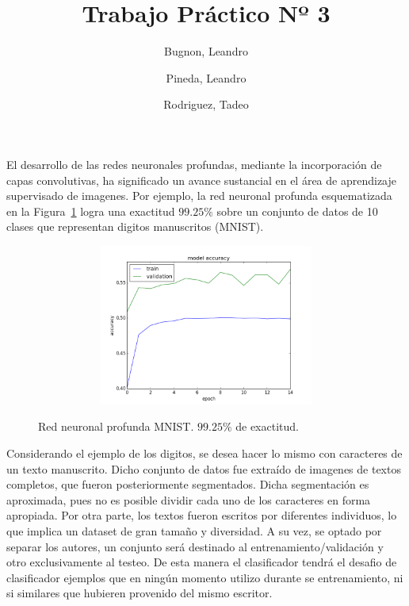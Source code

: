 \documentclass{article}[12pt, a4paper]
\title{Trabajo Pr\'actico Nº 3}
\author{Bugnon, Leandro \and Pineda, Leandro \and Rodriguez, Tadeo}
\date{}
\begin{document}



\maketitle
El desarrollo de las redes neuronales profundas, mediante la incorporaci\'on
de capas convolutivas, ha significado un avance sustancial en el \'area de
aprendizaje supervisado de imagenes. Por ejemplo, la red neuronal profunda
esquematizada en la Figura~\ref{redorig} logra una exactitud $99.25\%$ sobre
un conjunto de datos de 10 clases que representan digitos manuscritos (MNIST).



\begin{figure}[h]
\includegraphics[width=400pt,height=150pt]{ej1acc}
\label{redorig}
\caption{Red neuronal profunda MNIST. $99.25\%$ de exactitud.}
\end{figure}
Considerando el ejemplo de los digitos,
se desea hacer lo mismo con caracteres de un texto manuscrito. Dicho conjunto de datos fue extra\'ido
de imagenes de textos completos, que fueron posteriormente segmentados. Dicha segmentaci\'on es aproximada,
pues no es posible dividir cada uno de los caracteres en forma apropiada. Por otra parte, los textos
fueron escritos por diferentes individuos, lo que implica un dataset de gran tama\~no y diversidad.
A su vez, se optado por separar los autores, un conjunto ser\'a destinado al entrenamiento/validaci\'on y
otro exclusivamente al testeo. De esta manera el clasificador tendr\'a el desafio de clasificador
ejemplos que en ning\'un momento utilizo durante se entrenamiento, ni si similares que hubieren
provenido del mismo escritor.
\end{document}

